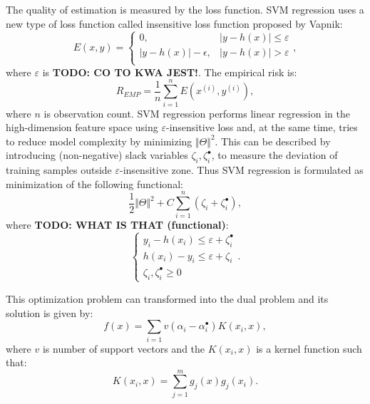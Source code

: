 The quality of estimation is measured by the loss function.
SVM regression uses a new type of loss function called insensitive loss function proposed 
by Vapnik:
\begin{equation}
	\label{equ:vapnik}
	E(x,y) = \begin{cases}
		0, & |y-h(x)| \leq \varepsilon \\
		|y-h(x)|-\epsilon, & |y-h(x)| > \varepsilon \\
	\end{cases},
\end{equation}
where $\varepsilon$ is \textbf{TODO: CO TO KWA JEST!}.
The empirical risk is:
\begin{equation}
	\label{equ:risk}
	R_{EMP} = \frac{1}{n}\sum_{i=1}^{n}E(x^{(i)}, y^{(i)}),
\end{equation}
where $n$ is observation count.
SVM regression performs linear regression in the high-dimension feature space using 
$\varepsilon$-insensitive loss and, at the same time, tries to reduce model complexity 
by minimizing $\Vert \Theta \Vert^2$. 
This can be described by introducing (non-negative) slack variables 
$\zeta_{i}, \zeta^{\bullet}_{i}$, to measure the deviation of training samples outside
$\varepsilon$-insensitive zone. Thus SVM regression is formulated as minimization 
of the following functional:
\begin{equation}
	\label{equ:svm_functional_pt1}
	\frac{1}{2}\Vert \Theta \Vert^{2} + C\sum_{i=1}^{n}(\zeta_{i}+\zeta^{\bullet}_{i}),
\end{equation}
where \textbf{TODO: WHAT IS THAT (functional)}:
\begin{equation}
	\label{equ:svm_functional_pt2}
	\begin{cases}
		y_{i}-h(x_{i}) \leq \varepsilon + \zeta^{\bullet}_{i}\\
		h(x_{i}) - y_{i} \leq \varepsilon + \zeta_{i}\\
		\zeta_{i},\zeta^{\bullet}_{i} \geq 0
	\end{cases}.
\end{equation}

This optimization problem can transformed into the dual problem and its solution is given by:
\begin{equation}
	\label{equ:svm_dual}
	f(x)=\sum_{i=1}{v}(\alpha_{i}-\alpha^{\bullet}_{i})K(x_{i},x),
\end{equation}
where $v$ is number of support vectors and the $K(x_{i},x)$ is a kernel function such that:
\begin{equation}
	\label{equ:svm_kernel}
	K(x_{i},x) = \sum_{j=1}^{m}g_{j}(x)g_{j}(x_{i}).
\end{equation}


